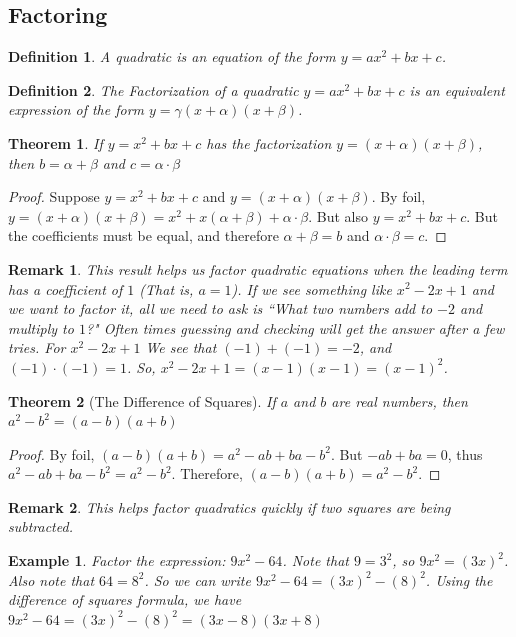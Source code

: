 \documentclass[oneside]{book}
\theoremstyle{mystyle}
\newtheorem{theorem}{Theorem}[section]
\newtheorem{definition}{Definition}[section]
\newtheorem{example}{Example}[section]
\newtheorem{remark}{Remark}[section]
\begin{document}
\subsection{Factoring}
\begin{definition}
A quadratic is an equation of the form $y=ax^2+bx+c$.
\end{definition}
\begin{definition}
The Factorization of a quadratic $y=ax^2+bx+c$ is an equivalent expression of the form $y=\gamma(x+\alpha)(x+\beta)$.
\end{definition}
\begin{theorem}
\label{theorem:north_shore_factorization_of_quadratic_when_a_is_equal_to_zero}
If $y=x^2+bx+c$ has the factorization $y=(x+\alpha)(x+\beta)$, then $b=\alpha+\beta$ and $c=\alpha\cdot\beta$
\end{theorem}
\begin{proof}
Suppose $y = x^2 + bx + c$ and $y = (x+\alpha)(x+\beta)$. By \gls{foil}, $y = (x+\alpha)(x+\beta) = x^2 +x(\alpha + \beta) + \alpha \cdot \beta$. But also $y=x^2 + bx + c$. But the coefficients must be equal, and therefore $\alpha + \beta = b$ and $\alpha \cdot \beta = c$.
\end{proof}
\begin{remark}\label{remark:north_shore_example_of_using_factorization_when_a_equals_zero}
This result helps us factor quadratic equations when the leading term has a coefficient of $1$ (That is, $a=1$). If we see something like $x^2-2x + 1$ and we want to factor it, all we need to ask is ``What two numbers add to $-2$ and multiply to $1$?" Often times guessing and checking will get the answer after a few tries. For $x^2-2x+1$ We see that $(-1)+(-1) = -2$, and $(-1)\cdot (-1) = 1$. So, $x^2 - 2x +1 = (x-1)(x-1) = (x-1)^2$.
\end{remark}
\begin{theorem}[The Difference of Squares]
\label{theorem:north_shore_difference_of_squares}
If $a$ and $b$ are real numbers, then $a^{2}-b^{2}=(a-b)(a+b)$
\end{theorem}
\begin{proof}
By \gls{foil}, $(a-b)(a+b) = a^2 - ab + ba - b^2$. But $-ab+ba = 0$, thus $a^2 - ab + ba - b^2 = a^2 - b^2$. Therefore, $(a-b)(a+b) = a^2-b^2$.
\end{proof}
\begin{remark}
This helps factor quadratics quickly if two squares are being subtracted.
\end{remark}
\begin{example}
Factor the expression: $9x^2 - 64$. Note that $9 = 3^2$, so $9x^2 = (3x)^2$. Also note that $64 = 8^2$. So we can write $9x^2 - 64 = (3x)^2 - (8)^2$. Using the difference of squares formula, we have $9x^2 - 64 = (3x)^2 - (8)^2 = (3x-8)(3x+8)$
\end{example}
\end{document}
